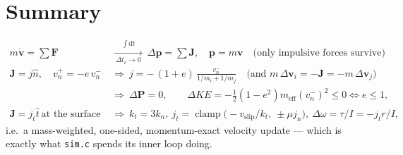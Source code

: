 \documentclass[a4paper,11pt]{article}
\newcommand{\vV}{\bm{v}}
\newcommand{\Jimp}{\bm{J}}
\newcommand{\hh}{\hat{n}}
\newcommand{\ttt}{\hat{t}}
\newcommand{\pp}{\bm{p}}          %
\newcommand{\PP}{\bm{P}}          %
\newcommand{\dtc}{\Delta t_c}     %
\newcommand{\dd}{\mathrm{d}}
\begin{document}
\section*{Summary}
\vspace{-0.8em}
{\small
\begin{align*}
  m\dot{\vV}=\textstyle\sum\bm F
  &\ \xrightarrow[\ \dtc\to0\ ]{\ \int \dd t\ }\
   \Delta\pp=\textstyle\sum\Jimp,\quad\pp=m\vV
   \quad\text{(only impulsive forces survive)}\\
  \Jimp=j\hh,\quad v_n^{+}=-e\,v_n^{-}
  &\ \Longrightarrow\
   j=-\,(1+e)\,\frac{v_n^{-}}{1/m_i+1/m_j}
   \quad\text{(and }m\,\Delta\vV_i=-\Jimp=-m\,\Delta\vV_j\text{)}\\
  &\ \Longrightarrow\ \Delta\PP=0,\qquad
   \Delta KE=-\tfrac12(1-e^2)m_{\text{eff}}(v_n^{-})^2\le0 \iff e\le1,\\
  \Jimp=j_t\ttt\ \text{at the surface}
  &\ \Longrightarrow\ k_t=3k_n,\
   j_t=\operatorname{clamp}\!\bigl(-v_{\text{slip}}/k_t,\ \pm\mu j_n\bigr),\
   \Delta\omega=\tau/I=-j_t r/I,
\end{align*}
i.e.\ a mass-weighted, one-sided, momentum-exact velocity update --- which is
exactly what \texttt{sim.c} spends its inner loop doing.
}
\end{document}
